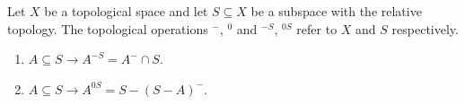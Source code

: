 Let $X$ be a topological space and let $S \subseteq X$ be a subspace with the relative topology. The topological operations $^{-}$, $^{0}$ and $^{-S}$, $^{0S}$ refer to $X$ and $S$ respectively.

\begin{enumerate}
\item $A \subseteq S \rightarrow A^{-S} = A^{-} \cap S$.
\item $A \subseteq S \rightarrow A^{0S} = S - (S - A)^{-}$.
\end{enumerate}
